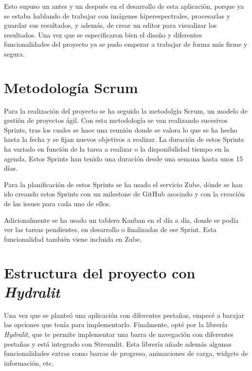 Esto supuso un antes y un después en el desarrollo de esta aplicación, porque ya se estaba hablando de trabajar con imágenes hiperespectrales, procesarlas y guardar sus resultados, y además, de crear un editor para visualizar los resultados. Una vez que se especificaron bien el diseño y diferentes funcionalidades del proyecto ya se pudo empezar a trabajar de forma más firme y segura.




\section{Metodología Scrum}

Para la realización del proyecto se ha seguido la metodolgía Scrum, un modelo de gestión de proyectos ágil. Con esta metodología se van realizando sucesivos Sprints, tras los cuales se hace una reunión donde se valora lo que se ha hecho hasta la fecha y se fijan nuevos objetivos a realizar. La duración de estos Sprints ha variado en función de la tarea a realizar o la disponibilidad tiempo en la agenda. Estos Sprints han tenido una duración desde una semana hasta unos 15 días.


Para la planificación de estos Sprints se ha usado el servicio Zube, dónde se han ido creando estos Sprints con un milestone de GitHub asociado y con la creación de las issues para cada uno de ellos.

Adicionalmente se ha usado un tablero Kanban en el día a día, donde se podía ver las tareas pendientes, en desarrollo o finalizadas de ese Sprint. Esta funcionalidad también viene incluida en Zube.


\section{Estructura del proyecto con \textit{Hydralit}}
Una vez que se planteó una aplicación con diferentes pestañas, empecé a barajar las opciones que tenía para implementarlo. Finalmente, opté por la librería \textit{Hydralit}, que te permite implementar una barra de navegación con diferentes pestañas y está integrado con Streamlit. Esta librería añade además algunas funcionalidades extras como barras de progreso, animaciones de carga, widgets de información, etc.


